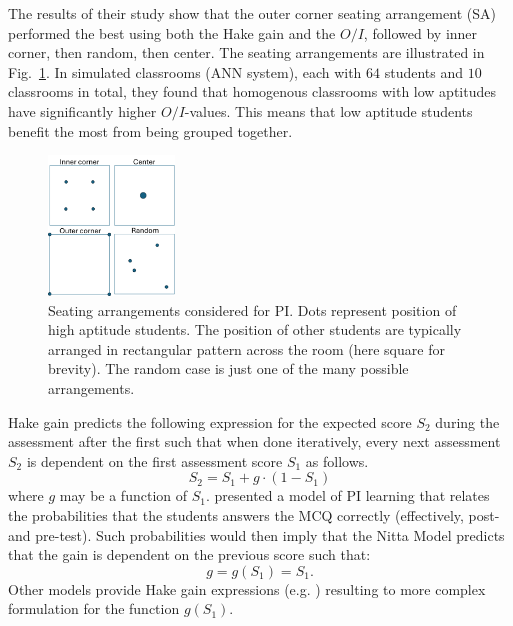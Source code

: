 \documentclass[twocolumn,secnumarabic,amssymb, nobibnotes, aps, prd]{revtex4-2}
\begin{document}
    The results of their study show that the outer corner seating arrangement (SA) performed the best using both the Hake gain and the $O/I$, followed by inner corner, then random, then center.
    The seating arrangements are illustrated in Fig.~\ref{fig:PI-SAs}.
    In simulated classrooms (ANN system), each with $64$ students and $10$ classrooms in total, they found that homogenous classrooms with low aptitudes have significantly higher $O/I$-values.
    This means that low aptitude students benefit the most from being grouped together.
    \begin{figure}[htb]
        \centering
        \includegraphics[width=0.30\textwidth]{figures/PI SAs.png}
        \caption{%
        Seating arrangements considered for PI.
        Dots represent position of high aptitude students.
        The position of other students are typically arranged in rectangular pattern across the room (here square for brevity).
        The random case is just one of the many possible arrangements.
        }
        \label{fig:PI-SAs}
    \end{figure}

    Hake gain predicts the following expression for the expected score $S_2$ during the assessment after the first such that when done iteratively, every next assessment $S_2$ is dependent on the first assessment score $S_1$ as follows.
    \begin{equation}
        S_2 = S_1 + g\cdot(1-S_1)
    \end{equation}
    where $g$ may be a function of $S_1$.
    \citet{nitta2019mathematical} presented a model of PI learning that relates the probabilities that the students answers the MCQ correctly (effectively, post- and pre-test).
    Such probabilities would then imply that the Nitta Model predicts that the gain is dependent on the previous score such that:
    \begin{equation}
        g = g(S_1) = S_1.
    \end{equation}
    Other models provide Hake gain expressions (e.g. \citet{pritchard2008mathematical}) resulting to more complex formulation for the function $g(S_1)$.
\end{document}
